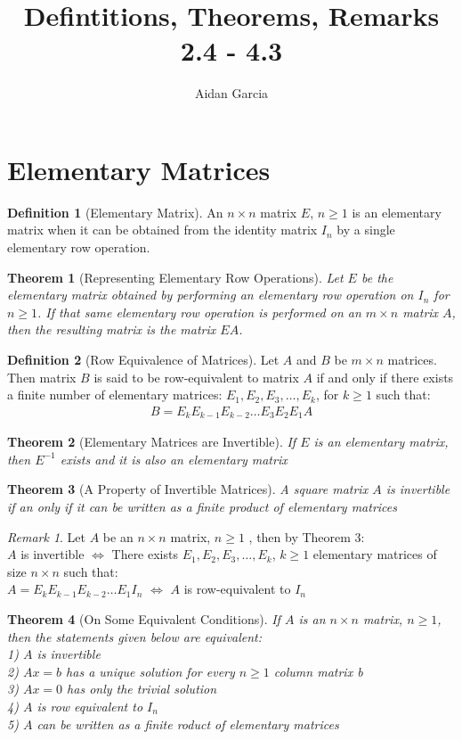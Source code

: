 \documentclass{jhwhw}
\author{Aidan Garcia}
\title{Defintitions, Theorems, Remarks 2.4 - 4.3}
\newtheorem{theorem}{Theorem}
\theoremstyle{definition}
\newtheorem{definition}{Definition}
\theoremstyle{remark}
\newtheorem*{remark}{Remark}
\theoremstyle{example}
\begin{document}
\section{Elementary Matrices}
\begin{definition}[Elementary Matrix] An \(n \times n\) matrix \(E\), \(n \geq 1\) is an elementary matrix when it can be obtained from the identity matrix \(I_n\) by a single elementary row operation. \end{definition}
\begin{theorem}[Representing Elementary Row Operations] Let \(E\) be the elementary matrix obtained by performing an elementary row operation on \(I_n\) for \(n \geq 1\).
If that same elementary row operation is performed on an \(m \times n\) matrix \(A\), then the resulting matrix is the matrix \(EA\).\end{theorem}
\begin{definition}[Row Equivalence of Matrices] Let \(A\) and \(B\) be \(m \times n\) matrices. Then matrix \(B\) is said to be row-equivalent to matrix \(A\) if and only if there exists a finite number of elementary matrices: \(E_1, E_2, E_3, \ldots, E_k\), for \(k \geq 1\) such that:
\begin{align*} B = E_k E_{k-1} E_{k-2} \ldots E_3 E_2 E_1 A \end{align*}\end{definition}
\begin{theorem}[Elementary Matrices are Invertible] If \(E\) is an elementary matrix, then \(E^{-1}\) exists and it is also an elementary matrix \end{theorem}
\begin{theorem}[A Property of Invertible Matrices] A square matrix \(A\) is invertible if an only if it can be written as a finite product of elementary matrices \end{theorem}
\begin{remark} Let \(A\) be an \(n \times n\) matrix, \(n \geq 1\) , then by Theorem 3:\\
\(A\) is invertible \(\Leftrightarrow\) There exists \(E_1,E_2,E_3,\ldots,E_k\), \(k \geq 1\) elementary matrices of size \(n \times n\) such that: \\
\(A=E_k E_{k-1} E_{k-2} \ldots E_1 I_n\) \(\Leftrightarrow\) \(A\) is row-equivalent to \(I_n\)
\end{remark}
\begin{theorem}[On Some Equivalent Conditions] If \(A\) is an \(n \times n\) matrix, \(n \geq 1\), then the statements given below are equivalent:\\
1) \(A\) is invertible\\
2) \(Ax = b\) has a unique solution for every \(n \geq 1\) column matrix b\\
3) \(Ax = 0\) has only the trivial solution\\
4) \(A\) is row equivalent to \(I_n\)\\
5) \(A\) can be written as a finite roduct of elementary matrices \end{theorem}
\end{document}
